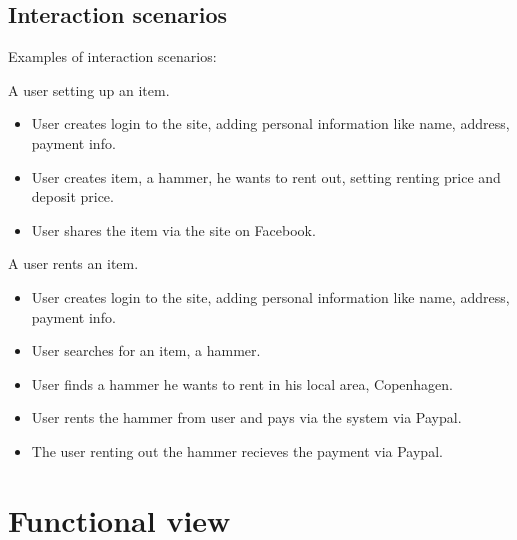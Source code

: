 \documentclass[a4paper,11pt]{report}
\begin{document}
\subsection{Interaction scenarios}
\label{sec:inter-scen}
Examples of interaction scenarios:

A user setting up an item.
\begin{itemize}
  \item User creates login to the site, adding personal information like name, address, payment info.
  \item User creates item, a hammer, he wants to rent out, setting renting price and deposit price.
  \item User shares the item via the site on Facebook.
\end{itemize}

A user rents an item.
\begin{itemize}
  \item User creates login to the site, adding personal information like name, address, payment info.
  \item User searches for an item, a hammer.
  \item User finds a hammer he wants to rent in his local area, Copenhagen.
  \item User rents the hammer from user and pays via the system via Paypal.
  \item The user renting out the hammer recieves the payment via Paypal.
\end{itemize}

\section{Functional view}
\label{sec:functional-view}
\end{document}
